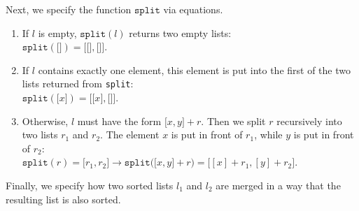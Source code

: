 \noindent
Next, we specify the function $\texttt{split}$ via equations.
\begin{enumerate}
\item If $l$ is empty, $\mathtt{split}(l)$ returns two empty lists:\\[0.2cm]
      \hspace*{1.3cm} 
      $\mathtt{split}(\texttt{[]}) = \mathtt{[} \texttt{[]}, \texttt{[]} \mathtt{]}$.
\item If $l$ contains exactly one element, this element is put into the first of the two lists
      returned from \texttt{split}: \\[0.2cm]
      \hspace*{1.3cm} 
      $\mathtt{split}(\mathtt{[}x\mathtt{]}) = \mathtt{[} \texttt{[}x\texttt{]}, \texttt{[]} \mathtt{]}$.
\item Otherwise, $l$ must have the form $\mathtt{[}x, y\mathtt{]} + r$.
      Then we split $r$ recursively into two lists $r_1$ and $r_2$.  The element $x$ is put in front
      of $r_1$, while $y$ is put in front of $r_2$:
      \\[0.2cm]
      \hspace*{1.3cm} 
      $\mathtt{split}(r) = \mathtt{[}r_1, r_2\mathtt{]} \rightarrow
      \mathtt{split}\bigl(\mathtt{[}x, y\mathtt{]} + r\bigr) = \bigl[ [x] + r_1, [y] + r_2 \bigr]$.
\end{enumerate}
Finally, we specify how two sorted lists $l_1$ and $l_2$ are merged in a way that the resulting list
is also sorted.
